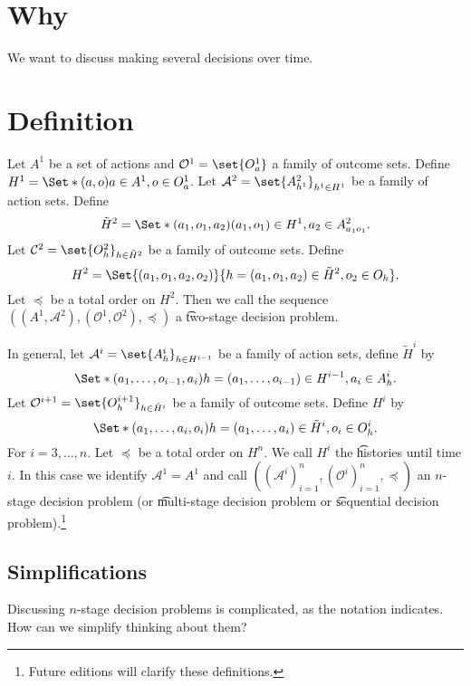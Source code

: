

\section*{Why}

We want to discuss making several decisions over time.

\section*{Definition}

Let $A^{1}$ be a set of actions and $\mathcal{O}^1 = \set{O^{1}_a}$ a family of outcome sets.
Define $H^1 = \Set*{(a, o)}{a \in A^1, o \in O^{1}_a}$.
Let $\mathcal{A} ^2 = \set{A^{2}_{h^1}}_{h^1 \in H^1}$ be a family of action sets.
Define
\[
\tilde{H}^{2} = \Set*{(a_1, o_1, a_2)}{(a_1, o_1) \in H^1, a_2 \in A^{2}_{a_1o_1}}.
\]
Let $\mathcal{C}^2 = \set{O^{2}_{h}}_{h \in \tilde{H}^2}$ be a family of outcome sets.
Define
\[
H^2 = \Set{(a_1, o_1, a_2, o_2)}{h = (a_1, o_1, a_2) \in \tilde{H}^2, o_2 \in O_{h}}.
\]
Let $\preceq$ be a total order on $H^2$.
Then we call the sequence $((A^1, \mathcal{A} ^2), (\mathcal{O}^1, \mathcal{O}^2), \preceq)$ a \t{two-stage decision problem}.

In general, let $\mathcal{A} ^{i} = \set{A^i_{h}}_{h \in H^{i-1}}$ be a family of action sets, define $\tilde{H}^i$ by
\[
\Set*{(a_1, \dots , o_{i-1}, a_i)}{h = (a_1, \dots , o_{i-1}) \in H^{i-1}, a_i \in A^i_{h}}.
\]
Let $\mathcal{O}^{i+1} = \set{O^{i+1}_{h}}_{h \in \tilde{H}^{i}}$ be a family of outcome sets. Define $H^{i}$ by
\[
\Set*{(a_1, \dots , a_i, o_i)}{h = (a_1, \dots , a_i) \in \tilde{H}^{i}, o_i \in O^i_{h}}.
\]
For $i = 3, \dots , n$.
Let $\preceq$ be a total order on $H^{n}$.
We call $H^i$ the \t{histories until time $i$}.
In this case we identify $\mathcal{A} ^1 = A^1$ and call $((\mathcal{A} ^i)_{i = 1}^{n}, (\mathcal{O}^i)_{i = 1}^{n}, \preceq)$ an \t{$n$-stage decision problem} (or \t{multi-stage decision problem} or \t{sequential decision problem}).\footnote{Future editions will clarify these definitions.}

\subsection*{Simplifications}

Discussing $n$-stage decision problems is complicated, as the notation indicates.
How can we simplify thinking about them?

